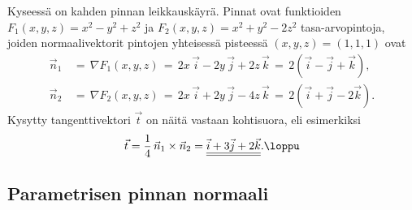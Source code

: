 \ratk Kyseessä on kahden pinnan leikkauskäyrä. Pinnat ovat funktioiden $F_1(x,y,z)=x^2-y^2+z^2$
ja $F_2(x,y,z)=x^2+y^2-2z^2$ tasa-arvopintoja, joiden normaalivektorit pintojen yhteisessä 
pisteessä $(x,y,z)=(1,1,1)$ ovat
\begin{align*}
\vec n_1\,&=\,\nabla F_1(x,y,z)\,
           =\,2x\,\vec i - 2y\,\vec j + 2z\,\vec k\,=\,2(\vec i-\vec j+\vec k), \\
\vec n_2\,&=\,\nabla F_2(x,y,z)\,
           =\,2x\,\vec i + 2y\,\vec j - 4z\,\vec k\,=\,2(\vec i+\vec j-2\vec k).
\end{align*}
Kysytty tangenttivektori $\vec t$ on näitä vastaan kohtisuora, eli esimerkiksi
\[
\vec t = \frac{1}{4}\,\vec n_1\times\vec n_2 
       = \underline{\underline{\vec i+3\vec j+2\vec k}}. \loppu
\]

\subsection*{Parametrisen pinnan normaali}


